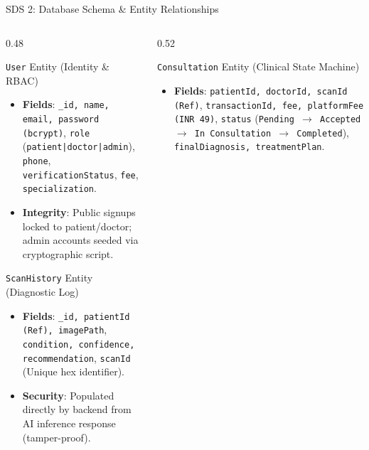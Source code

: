 \documentclass[aspectratio=169, 10pt]{beamer}
\begin{document}
\begin{frame}{SDS 2: Database Schema \& Entity Relationships}
\begin{columns}[T]
    \begin{column}{0.48\textwidth}
        \begin{block}{\texttt{User} Entity (Identity \& RBAC)}
            \footnotesize
            \begin{itemize}
                \item \textbf{Fields}: \texttt{\_id, name, email, password (bcrypt)}, \texttt{role} (\texttt{patient|doctor|admin}), \texttt{phone}, \texttt{verificationStatus}, \texttt{fee}, \texttt{specialization}.
                \item \textbf{Integrity}: Public signups locked to patient/doctor; admin accounts seeded via cryptographic script.
            \end{itemize}
        \end{block}
        \begin{block}{\texttt{ScanHistory} Entity (Diagnostic Log)}
            \footnotesize
            \begin{itemize}
                \item \textbf{Fields}: \texttt{\_id, patientId (Ref), imagePath}, \texttt{condition, confidence, recommendation}, \texttt{scanId} (Unique hex identifier).
                \item \textbf{Security}: Populated directly by backend from AI inference response (tamper-proof).
            \end{itemize}
        \end{block}
    \end{column}
    \begin{column}{0.52\textwidth}
        \begin{block}{\texttt{Consultation} Entity (Clinical State Machine)}
            \footnotesize
            \begin{itemize}
                \item \textbf{Fields}: \texttt{patientId, doctorId, scanId (Ref)}, \texttt{transactionId, fee, platformFee (INR 49)}, \texttt{status} (\texttt{Pending $\to$ Accepted $\to$ In Consultation $\to$ Completed}), \texttt{finalDiagnosis, treatmentPlan}.
            \end{itemize}
        \end{block}

\end{column}
\end{columns}
\end{frame}
\end{document}
